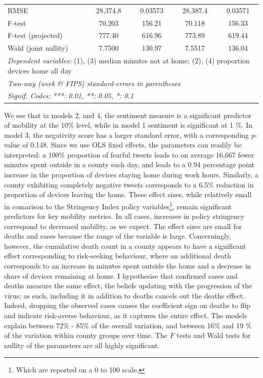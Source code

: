 \documentclass[12pt,a4]{article}
\begin{document}
\begin{singlespace}
\begin{table}[!htb]
\begin{tabular}{lcccc}
  RMSE & 28,374.8&0.03573&28,387.4&0.03571\\
  F-test & 70.203&156.21&70.118&156.33\\
  F-test (projected) & 777.40&616.96&773.89&619.44\\
  Wald (joint nullity) & 7.7500&130.97&7.5517&136.04\\
  \midrule\midrule\multicolumn{5}{l}{\emph{Dependent variables:} (1), (3) median minutes not at home; (2), (4) proportion devices home all day}\\
  \multicolumn{5}{l}{\emph{Two-way (week \& FIPS) standard-errors in parentheses}}\\
  \multicolumn{5}{l}{\emph{Signif. Codes: ***: 0.01, **: 0.05, *: 0.1}}\\
  \end{tabular}
\end{table}
\end{singlespace}
We see that in models 2, and 4, the sentiment measure is a significant predictor of mobility at the 10\% level, while in model 1 sentiment is significant at 1 \%. In model 3, the negativity score has a larger standard error, with a corresponding \(p\)-value of 0.148. Since we use OLS fixed effects, the parameters can readily be interpreted: a 100\% proportion of fearful tweets leads to on average 16,667 fewer minutes spent outside in a county each day, and leads to a 0.94 percentage point increase in the proportion of devices staying home during work hours. Similarly, a county exhibiting completely negative tweets corresponds to a 6.5\% reduction in proportion of devices leaving the home. These effect sizes, while relatively small in comarison to the Stringency Index policy variables\footnote{Which are reported on a 0 to 100 scale.}, remain significant predictors for key mobility metrics. In all cases, increases in policy stringency correspond to decreased mobility, as we expect. The effect sizes are small for deaths and cases because the range of the variable is large. Concerningly, however, the cumulative death count in a county appears to have a significant effect corresponding to risk-seeking behaviour, where an additional death corresponds to an increase in minutes spent outside the home and a decrease in share of devices remaining at home. I hypothesise that confirmed cases and deaths measure the same effect, the beliefs updating with the progression of the virus; as such, including it in addition to deaths cancels out the deaths effect. Indeed, dropping the observed cases causes the coefficient sign on deaths to flip and indicate risk-averse behaviour, as it captures the entire effect. The models explain between 72\% - 85\% of the overall variation, and between 16\% and 19 \% of the variation within county groups over time. The \(F\) tests and Wald tests for nullity of the parameters are all highly significant.
\end{document}
